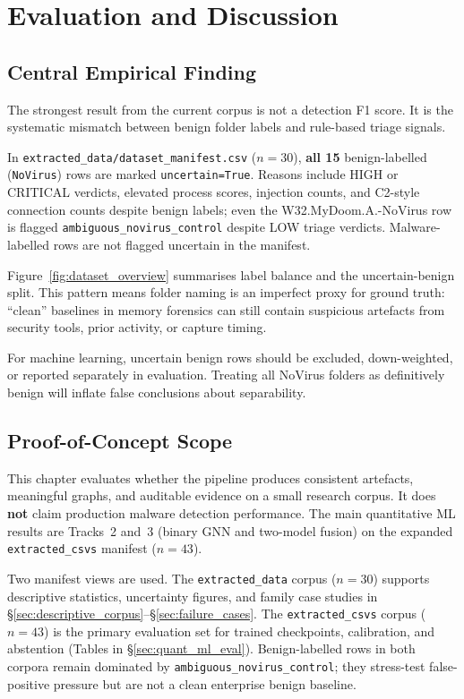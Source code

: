 \chapter{Evaluation and Discussion}
\label{ch:evaluation}

\section{Central Empirical Finding}

The strongest result from the current corpus is not a detection F1 score. It is the systematic mismatch between benign folder labels and rule-based triage signals.

In \texttt{extracted\_data/dataset\_manifest.csv} ($n{=}30$), \textbf{all 15} benign-labelled (\texttt{NoVirus}) rows are marked \texttt{uncertain=True}. Reasons include HIGH or CRITICAL verdicts, elevated process scores, injection counts, and C2-style connection counts despite benign labels; even the W32.MyDoom.A.-NoVirus row is flagged \texttt{ambiguous\_novirus\_control} despite LOW triage verdicts. Malware-labelled rows are not flagged uncertain in the manifest.

Figure~\ref{fig:dataset_overview} summarises label balance and the uncertain-benign split. This pattern means folder naming is an imperfect proxy for ground truth: ``clean'' baselines in memory forensics can still contain suspicious artefacts from security tools, prior activity, or capture timing.

For machine learning, uncertain benign rows should be excluded, down-weighted, or reported separately in evaluation. Treating all NoVirus folders as definitively benign will inflate false conclusions about separability.

\section{Proof-of-Concept Scope}

This chapter evaluates whether the pipeline produces consistent artefacts, meaningful graphs, and auditable evidence on a small research corpus. It does \textbf{not} claim production malware detection performance. The main quantitative ML results are Tracks~2 and~3 (binary GNN and two-model fusion) on the expanded \texttt{extracted\_csvs} manifest ($n{=}43$).

Two manifest views are used. The \texttt{extracted\_data} corpus ($n{=}30$) supports descriptive statistics, uncertainty figures, and family case studies in \S\ref{sec:descriptive_corpus}--\S\ref{sec:failure_cases}. The \texttt{extracted\_csvs} corpus ($n{=}43$) is the primary evaluation set for trained checkpoints, calibration, and abstention (Tables in \S\ref{sec:quant_ml_eval}). Benign-labelled rows in both corpora remain dominated by \texttt{ambiguous\_novirus\_control}; they stress-test false-positive pressure but are not a clean enterprise benign baseline.

